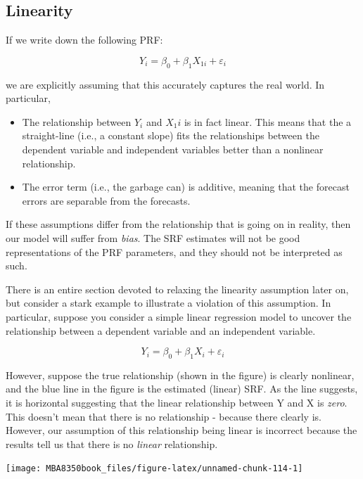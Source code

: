 \documentclass[
]{book}
\begin{document}
\hypertarget{linearity}{%
\subsection{Linearity}\label{linearity}}

If we write down the following PRF:

\[Y_i = \beta_0 + \beta_1X_{1i}+\varepsilon_i\]

we are explicitly assuming that this accurately captures the real world. In particular,

\begin{itemize}
\item
  The relationship between \(Y_i\) and \(X_1i\) is in fact linear. This means that the a straight-line (i.e., a constant slope) fits the relationships between the dependent variable and independent variables better than a nonlinear relationship.
\item
  The error term (i.e., the garbage can) is additive, meaning that the forecast errors are separable from the forecasts.
\end{itemize}

If these assumptions differ from the relationship that is going on in reality, then our model will suffer from \emph{bias}. The SRF estimates will not be good representations of the PRF parameters, and they should not be interpreted as such.

There is an entire section devoted to relaxing the linearity assumption later on, but consider a stark example to illustrate a violation of this assumption. In particular, suppose you consider a simple linear regression model to uncover the relationship between a dependent variable and an independent variable.

\[Y_i=\beta_0+\beta_1X_i+\varepsilon_i\]

However, suppose the true relationship (shown in the figure) is clearly nonlinear, and the blue line in the figure is the estimated (linear) SRF. As the line suggests, it is horizontal suggesting that the linear relationship between Y and X is \emph{zero}. This doesn't mean that there is no relationship - because there clearly is. However, our assumption of this relationship being linear is incorrect because the results tell us that there is no \emph{linear} relationship.

\begin{center}\texttt{[image: MBA8350book\_files/figure-latex/unnamed-chunk-114-1]} \end{center}
\end{document}
